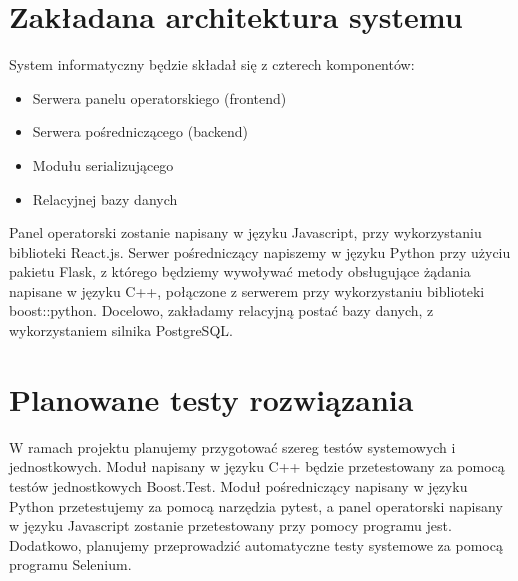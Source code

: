 \documentclass{article}
\begin{document}
\newpage
\section{Zakładana architektura systemu}
System informatyczny będzie składał się z czterech komponentów:

\begin{itemize}
	\item Serwera panelu operatorskiego (frontend)
	\item Serwera pośredniczącego (backend)
	\item Modułu serializującego
	\item Relacyjnej bazy danych
\end{itemize}

Panel operatorski zostanie napisany w języku Javascript, przy wykorzystaniu
biblioteki React.js. Serwer pośredniczący napiszemy w języku Python przy użyciu
pakietu Flask, z którego będziemy wywoływać metody obsługujące żądania napisane
w języku C++, połączone z serwerem przy wykorzystaniu biblioteki boost::python.
Docelowo, zakładamy relacyjną postać bazy danych, z wykorzystaniem silnika PostgreSQL.

\section{Planowane testy rozwiązania}
W ramach projektu planujemy przygotować szereg testów systemowych i jednostkowych.
Moduł napisany w języku C++ będzie przetestowany za pomocą testów jednostkowych Boost.Test.
Moduł pośredniczący napisany w języku Python przetestujemy za pomocą narzędzia pytest, a panel
operatorski napisany w języku Javascript zostanie przetestowany przy pomocy programu jest.
Dodatkowo, planujemy przeprowadzić automatyczne testy systemowe za pomocą programu Selenium.
\end{document}
